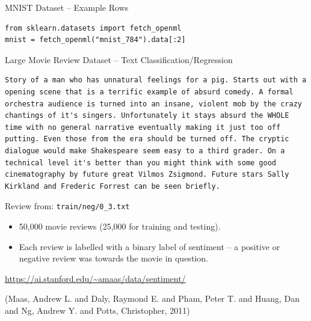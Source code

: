 \documentclass[10pt]{beamer}
\begin{document}
\begin{frame}[label={sec:org1d34594},fragile]{MNIST Dataset -- Example Rows}
 \begin{verbatim}
from sklearn.datasets import fetch_openml
mnist = fetch_openml("mnist_784").data[:2]
\end{verbatim}
\end{frame}

\begin{frame}[label={sec:orgb853a8c},fragile]{Large Movie Review Dataset -- Text Classification/Regression}
 \begin{verbatim}
Story of a man who has unnatural feelings for a pig. Starts out with a
opening scene that is a terrific example of absurd comedy. A formal
orchestra audience is turned into an insane, violent mob by the crazy
chantings of it's singers. Unfortunately it stays absurd the WHOLE
time with no general narrative eventually making it just too off
putting. Even those from the era should be turned off. The cryptic
dialogue would make Shakespeare seem easy to a third grader. On a
technical level it's better than you might think with some good
cinematography by future great Vilmos Zsigmond. Future stars Sally
Kirkland and Frederic Forrest can be seen briefly.
\end{verbatim}

Review from: \texttt{train/neg/0\_3.txt}

\begin{itemize}
\item 50,000 movie reviews (25,000 for training and testing).
\item Each review is labelled with a binary label of sentiment -- a positive or negative
review was towards the movie in question.
\end{itemize}

\url{https://ai.stanford.edu/\~amaas/data/sentiment/}

(Maas, Andrew L. and Daly, Raymond E. and Pham, Peter T. and Huang, Dan and Ng, Andrew Y. and Potts, Christopher, 2011)
\end{frame}
\end{document}
